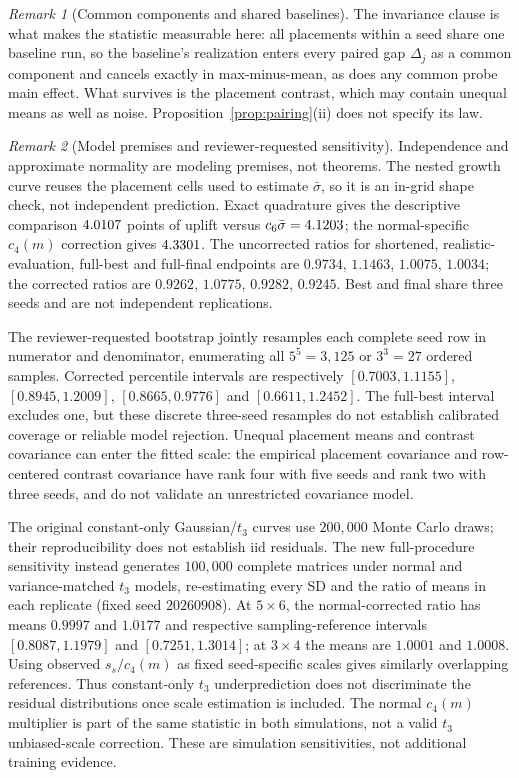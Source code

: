 \documentclass[10pt,letterpaper]{article}
\theoremstyle{remark}
\newtheorem*{remarkx}{Remark}
\begin{document}
\begin{remarkx}[Common components and shared baselines]
The invariance clause is what makes the statistic measurable here: all
placements within a seed share one baseline run, so the baseline's
realization enters every paired gap $\Delta_j$ as a common component and
cancels exactly in max-minus-mean, as does any common probe main effect.
What survives is the placement contrast, which may contain unequal means
as well as noise. Proposition~\ref{prop:pairing}(ii) does not specify its law.
\end{remarkx}

\begin{remarkx}[Model premises and reviewer-requested sensitivity]
Independence and approximate normality are modeling premises, not theorems.
The nested growth curve reuses the placement cells used to estimate
$\bar\sigma$, so it is an in-grid shape check, not independent prediction.
Exact quadrature gives the descriptive comparison $4.0107$ points of
uplift versus $c_6\bar\sigma=4.1203$; the normal-specific
$c_4(m)$ correction gives $4.3301$. The uncorrected ratios
for shortened, realistic-evaluation, full-best and full-final endpoints are
$0.9734$, $1.1463$, $1.0075$, $1.0034$; the corrected ratios are
$0.9262$, $1.0775$, $0.9282$, $0.9245$. Best and final share three seeds
and are not independent replications.

The reviewer-requested bootstrap jointly resamples each complete seed row
in numerator and denominator, enumerating all $5^5=3{,}125$ or $3^3=27$
ordered samples. Corrected percentile intervals are respectively
$[0.7003,1.1155]$, $[0.8945,1.2009]$, $[0.8665,0.9776]$ and
$[0.6611,1.2452]$. The full-best interval excludes one, but these discrete
three-seed resamples do not establish calibrated coverage or reliable model
rejection. Unequal placement means and contrast covariance can enter the
fitted scale: the empirical placement covariance and row-centered contrast
covariance have rank four with five seeds and rank two with three seeds,
and do not validate an unrestricted covariance model.

The original constant-only Gaussian/$t_3$ curves use $200{,}000$ Monte Carlo
draws; their reproducibility does not establish iid residuals. The new
full-procedure sensitivity instead generates $100{,}000$ complete matrices
under normal and variance-matched $t_3$ models, re-estimating every SD and
the ratio of means in each replicate (fixed seed $20260908$). At $5\times6$,
the normal-corrected ratio has means $0.9997$ and $1.0177$ and respective
sampling-reference intervals $[0.8087,1.1979]$ and $[0.7251,1.3014]$;
at $3\times4$ the means are $1.0001$ and $1.0008$. Using observed
$s_s/c_4(m)$ as fixed seed-specific scales gives similarly overlapping
references. Thus constant-only $t_3$ underprediction does not discriminate
the residual distributions once scale estimation is included. The normal
$c_4(m)$ multiplier is part of the same statistic in both simulations,
not a valid $t_3$ unbiased-scale correction. These are simulation
sensitivities, not additional training evidence.
\end{remarkx}
\end{document}
